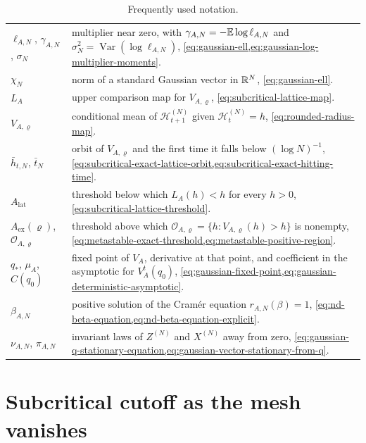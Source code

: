 \documentclass[11pt,reqno,a4paper]{article}
\newcommand{\Ee}{\E}
\DeclareMathOperator{\Var}{Var}
\begin{document}
\begin{table}[H]
\begin{tabular}{@{}p{}p{}@{}}
    $\ell_{A,N}$, $\gamma_{A,N}$, $\sigma_N$
      & multiplier near zero, with $\gamma_{A,N}=-\Ee\log\ell_{A,N}$ and
        $\sigma_N^2=\Var(\log\ell_{A,N})$,
        \cref{eq:gaussian-ell,eq:gaussian-log-multiplier-moments}. \\
    $\chi_N$
      & norm of a standard Gaussian vector in $\mathbb{R}^N$,
        \cref{eq:gaussian-ell}. \\
    $L_A$
      & upper comparison map for $V_{A,\varrho}$,
        \cref{eq:subcritical-lattice-map}. \\
    $V_{A,\varrho}$
      & conditional mean of $\mathscr H_{t+1}^{(N)}$ given
        $\mathscr H_t^{(N)}=h$, \cref{eq:rounded-radius-map}. \\
    $\bar h_{t,N}$, $\bar t_N$
      & orbit of $V_{A,\varrho}$ and the first time it falls below
        $(\log N)^{-1}$,
        \cref{eq:subcritical-exact-lattice-orbit,eq:subcritical-exact-hitting-time}. \\
    $A_{\mathrm{lat}}$
      & threshold below which $L_A(h)<h$ for every $h>0$,
        \cref{eq:subcritical-lattice-threshold}. \\
    $A_{\mathrm{ex}}(\varrho)$, $\mathcal O_{A,\varrho}$
      & threshold above which
        $\mathcal O_{A,\varrho}=\{h:V_{A,\varrho}(h)>h\}$ is nonempty,
        \cref{eq:metastable-exact-threshold,eq:metastable-positive-region}. \\
    $q_\ast$, $\mu_A$, $C(q_0)$
      & fixed point of $V_A$, derivative at that point, and coefficient in
        the asymptotic for $V_A^t(q_0)$,
        \cref{eq:gaussian-fixed-point,eq:gaussian-deterministic-asymptotic}. \\
    $\beta_{A,N}$
      & positive solution of the Cramér equation $r_{A,N}(\beta)=1$,
        \cref{eq:nd-beta-equation,eq:nd-beta-equation-explicit}. \\
    $\nu_{A,N}$, $\pi_{A,N}$
      & invariant laws of $Z^{(N)}$ and $X^{(N)}$ away from zero,
        \cref{eq:gaussian-q-stationary-equation,eq:gaussian-vector-stationary-from-q}. \\
    \bottomrule
  \end{tabular}
  \caption{Frequently used notation.}
  \label{tab:notation-guide}
\end{table}

\section{Subcritical cutoff as the mesh vanishes}
\label{sec:subcritical-precision}
\end{document}
